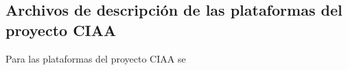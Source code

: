 \subsection{Archivos de descripción de las plataformas del proyecto CIAA}

Para las plataformas del proyecto CIAA se 
